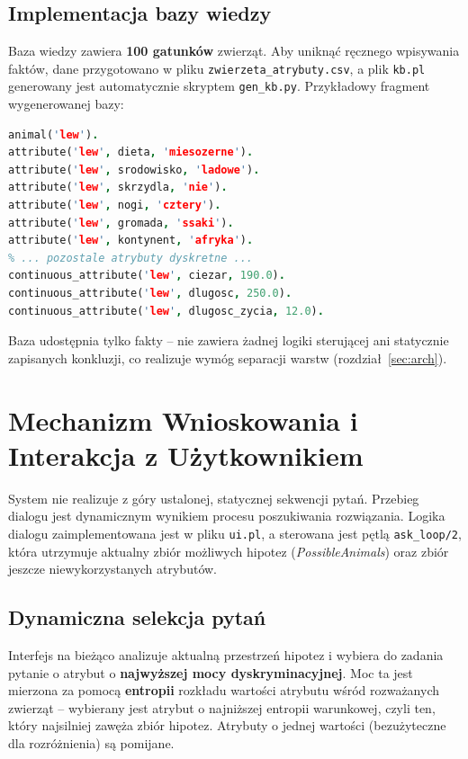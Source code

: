 \documentclass[11pt,a4paper]{article}
\newcommand{\code}[1]{\texttt{#1}}
\begin{document}
\subsection{Implementacja bazy wiedzy}
Baza wiedzy zawiera \textbf{100 gatunków} zwierząt. Aby uniknąć ręcznego
wpisywania faktów, dane przygotowano w pliku \code{zwierzeta\_atrybuty.csv},
a plik \code{kb.pl} generowany jest automatycznie skryptem \code{gen\_kb.py}.
Przykładowy fragment wygenerowanej bazy:

\begin{lstlisting}[language=Prolog,caption={Fragment bazy wiedzy (\code{kb.pl})}]
animal('lew').
attribute('lew', dieta, 'miesozerne').
attribute('lew', srodowisko, 'ladowe').
attribute('lew', skrzydla, 'nie').
attribute('lew', nogi, 'cztery').
attribute('lew', gromada, 'ssaki').
attribute('lew', kontynent, 'afryka').
% ... pozostale atrybuty dyskretne ...
continuous_attribute('lew', ciezar, 190.0).
continuous_attribute('lew', dlugosc, 250.0).
continuous_attribute('lew', dlugosc_zycia, 12.0).
\end{lstlisting}

Baza udostępnia tylko fakty -- nie zawiera żadnej logiki sterującej ani statycznie
zapisanych konkluzji, co realizuje wymóg separacji warstw (rozdział~\ref{sec:arch}).

\section{Mechanizm Wnioskowania i Interakcja z Użytkownikiem}
System nie realizuje z góry ustalonej, statycznej sekwencji pytań. Przebieg
dialogu jest dynamicznym wynikiem procesu poszukiwania rozwiązania. Logika
dialogu zaimplementowana jest w pliku \code{ui.pl}, a sterowana jest pętlą
\code{ask\_loop/2}, która utrzymuje aktualny zbiór możliwych hipotez
(\textit{PossibleAnimals}) oraz zbiór jeszcze niewykorzystanych atrybutów.

\subsection{Dynamiczna selekcja pytań}
Interfejs na bieżąco analizuje aktualną przestrzeń hipotez i wybiera do zadania
pytanie o atrybut o \textbf{najwyższej mocy dyskryminacyjnej}. Moc ta jest
mierzona za pomocą \textbf{entropii} rozkładu wartości atrybutu wśród
rozważanych zwierząt -- wybierany jest atrybut o najniższej entropii warunkowej,
czyli ten, który najsilniej zawęża zbiór hipotez. Atrybuty o jednej wartości
(bezużyteczne dla rozróżnienia) są pomijane.
\end{document}
